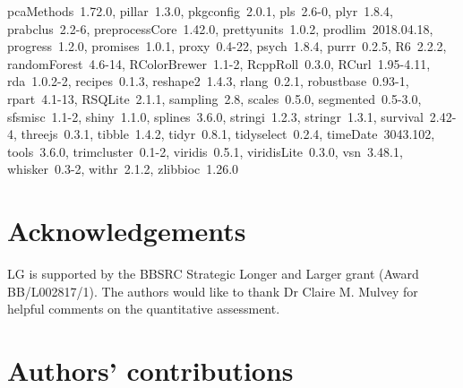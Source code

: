 \documentclass[12pt]{article}\usepackage[]{graphicx}\usepackage[]{color}
\begin{document}
\begin{itemize}
    pcaMethods~1.72.0, pillar~1.3.0, pkgconfig~2.0.1, pls~2.6-0,
    plyr~1.8.4, prabclus~2.2-6, preprocessCore~1.42.0,
    prettyunits~1.0.2, prodlim~2018.04.18, progress~1.2.0,
    promises~1.0.1, proxy~0.4-22, psych~1.8.4, purrr~0.2.5,
    R6~2.2.2, randomForest~4.6-14, RColorBrewer~1.1-2,
    RcppRoll~0.3.0, RCurl~1.95-4.11, rda~1.0.2-2, recipes~0.1.3,
    reshape2~1.4.3, rlang~0.2.1, robustbase~0.93-1, rpart~4.1-13,
    RSQLite~2.1.1, sampling~2.8, scales~0.5.0, segmented~0.5-3.0,
    sfsmisc~1.1-2, shiny~1.1.0, splines~3.6.0, stringi~1.2.3,
    stringr~1.3.1, survival~2.42-4, threejs~0.3.1, tibble~1.4.2,
    tidyr~0.8.1, tidyselect~0.2.4, timeDate~3043.102, tools~3.6.0,
    trimcluster~0.1-2, viridis~0.5.1, viridisLite~0.3.0,
    vsn~3.48.1, whisker~0.3-2, withr~2.1.2, zlibbioc~1.26.0
\end{itemize}


\section*{Acknowledgements}

LG is supported by the BBSRC Strategic Longer and Larger grant (Award
BB/L002817/1).
The authors would like to thank Dr Claire M. Mulvey for helpful
comments on the quantitative assessment.

\section*{Authors' contributions}



\end{document}
